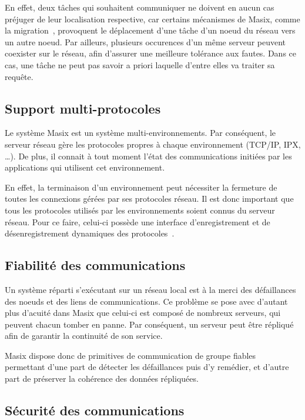 En effet, deux t\^aches qui souhaitent communiquer ne doivent en aucun cas
pr\'ejuger de leur localisation respective, car certains
m\'ecanismes de Masix, comme la migration~\cite{jrprc}, 
provoquent le d\'eplacement 
d'une t\^ache d'un noeud du r\'eseau vers un autre noeud. 
Par ailleurs,
plusieurs occurences d'un m\^eme
serveur peuvent coexister sur le r\'eseau, afin d'assurer une meilleure
tol\'erance aux fautes. Dans ce cas, une t\^ache ne peut pas savoir
a priori laquelle d'entre elles va traiter sa requ\^ete.

\subsection {Support multi-protocoles}

Le syst\`eme Masix est un syst\`eme multi-environnements. Par cons\'equent,
le serveur r\'eseau g\`ere les protocoles 
propres \`a chaque environnement (TCP/IP, IPX, \dots). 
De plus, il connait \`a tout moment l'\'etat des communications
initi\'ees par les applications qui utilisent cet environnement. 

En effet, la terminaison d'un environnement peut n\'ecessiter la fermeture
de toutes les connexions g\'er\'ees par ses protocoles r\'eseau. Il est donc
important que tous les protocoles utilis\'es par les environnements soient
connus du serveur r\'eseau.
Pour ce faire, celui-ci poss\`ede une interface
d'enregistrement et de d\'esenregistrement dynamiques des
protocoles~\cite{Tschudin91}.

\subsection {Fiabilit\'e des communications}

Un syst\`eme r\'eparti s'ex\'ecutant sur un r\'eseau local est \`a la merci des 
d\'efaillances des noeuds et des liens de communications. Ce probl\`eme
se pose avec d'autant plus d'acuit\'e dans Masix que celui-ci est compos\'e 
de nombreux serveurs, qui peuvent chacun tomber en panne. Par cons\'equent,
un serveur peut \^etre r\'epliqu\'e afin de garantir la continuit\'e de son 
service.

Masix dispose donc de primitives 
de communication de groupe fiables~\cite{Schiper93,Hadzi94} permettant 
d'une part de d\'etecter les d\'efaillances puis d'y rem\'edier, et d'autre part
de pr\'eserver la coh\'erence des donn\'ees r\'epliqu\'ees.

\subsection {S\'ecurit\'e des communications}


